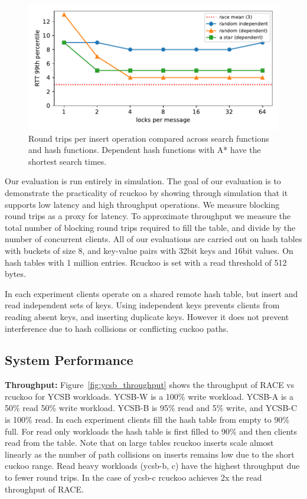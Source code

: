 \begin{figure}[ht]
    \includegraphics[width=0.99\linewidth]{fig/search_dependence.pdf}

    \caption{Round trips per insert operation compared
    across search functions and hash functions. Dependent
    hash functions with A* have the shortest search
    times.~}

    \label{fig:search_dependence}
\end{figure}

Our evaluation is run entirely in simulation. The goal of
our evaluation is to demonstrate the practicality of rcuckoo
by showing through simulation that it supports low latency
and high throughput operations. We measure blocking round
trips as a proxy for latency. To approximate throughput we
measure the total number of blocking round trips required to
fill the table, and divide by the number of concurrent
clients. All of our evaluations are carried out on hash
tables with buckets of size 8, and key-value pairs with
32bit keys and 16bit values. On hash tables with 1 million
entries. Rcuckoo is set with a read threshold of 512 bytes.

In each experiment clients operate on a shared remote hash
table, but insert and read independent sets of keys. Using
independent keys prevents clients from reading absent keys,
and inserting duplicate keys.  However it does not prevent
interference due to hash collisions or conflicting cuckoo
paths.


\subsection{System Performance}

\textbf{Throughput:} Figure~\ref{fig:ycsb_throughput} shows
the throughput of RACE vs rcuckoo for YCSB workloads. YCSB-W
is a 100\% write workload. YCSB-A is a 50\% read 50\% write
workload. YCSB-B is 95\% read and 5\% write, and YCSB-C is
100\% read.  In each experiment clients fill the hash table
from empty to 90\% full. For read only workloads the hash
table is first filled to 90\% and then clients read from the
table.  Note that on large tables rcuckoo inserts scale
almost linearly as the number of path collisions on inserts
remains low due to the short cuckoo range.  Read heavy
workloads (ycsb-b, c) have the highest throughput due to
fewer round trips. In the case of ycsb-c rcuckoo achieves 2x
the read throughput of RACE.

